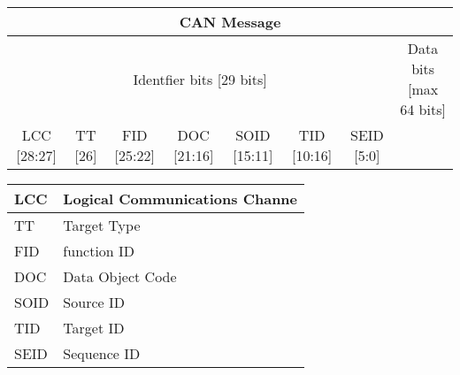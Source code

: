 \documentclass[10pt,a4paper]{article}
\begin{document}
\begin{table}[]
\begin{tabular}{|c|c|c|c|c|c|c|c|}
\hline
\multicolumn{8}{|c|}{CAN Message} \\ 
\hline
 \multicolumn{7}{|c|}{Identfier bits [29 bits]} &  \multicolumn{1}{|c|}{Data bits [max 64 bits]} \\
 \hline
 LCC [28:27] & TT [26] & FID [25:22] & DOC [21:16] & SOID [15:11] & TID [10:16] & SEID [5:0] & \\
\hline
\end{tabular}
\end{table}
\begin{table}

\begin{tabular}{|l|l|}
\hline
LCC & Logical Communications Channe \\
\hline
TT & Target Type \\
\hline
FID & function ID \\
\hline
DOC & Data Object Code \\
\hline
SOID & Source ID \\
\hline
TID & Target ID \\
\hline
SEID & Sequence ID \\
\hline
\end{tabular}
\end{table}
\end{document}
